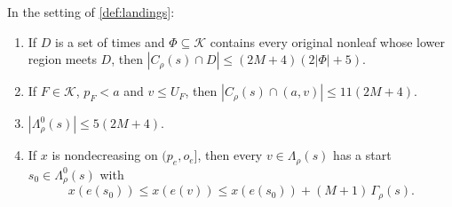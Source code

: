 \begin{lemma}\label{lem:landing-counts}
In the setting of \cref{def:landings}:
\begin{enumerate}[label=(\alph*)]
\item If $D$ is a set of times and $\Phi\subseteq\mathcal K$ contains every original
nonleaf whose lower region meets $D$, then $|C_\rho(s)\cap D|\le(2M+4)(2|\Phi|+5)$.
\item If $F\in\mathcal K$, $p_F<a$ and $v\le U_F$, then
$|C_\rho(s)\cap(a,v)|\le11(2M+4)$.
\item $|\Lambda^0_\rho(s)|\le5(2M+4)$.
\item If $x$ is nondecreasing on $(p_e,o_e]$, then every $v\in\Lambda_\rho(s)$ has a
start $s_0\in\Lambda^0_\rho(s)$ with
\[
 x(e(s_0))\le x(e(v))\le x(e(s_0))+(M+1)\,\Gamma_\rho(s).
\]
\end{enumerate}
\end{lemma}

